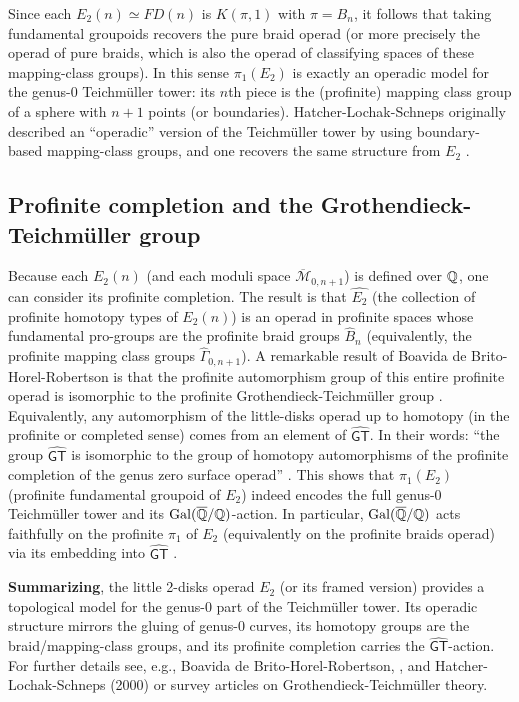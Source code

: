 Since each $E_2(n)\simeq FD(n)$ is $K(\pi,1)$ with $\pi=B_n$, it follows that taking fundamental groupoids recovers the pure braid operad (or more precisely the operad of pure braids, which is also the operad of classifying spaces of these mapping-class groups).  In this sense $\pi_1(E_2)$ is exactly an operadic model for the genus-0 Teichm\"uller tower: its $n$th piece is the (profinite) mapping class group of a sphere with $n+1$ points (or boundaries).  Hatcher-Lochak-Schneps originally described an “operadic” version of the Teichm\"uller tower by using boundary-based mapping-class groups, and one recovers the same structure from $E_2$ \cite{borghi_lecture_2025} \cite{de_brito_operads_2019}.

\subsection{Profinite completion and the Grothendieck-Teichm\"uller group}

Because each $E_2(n)$ (and each moduli space $\overline{\mathcal{M}}_{0,n+1}$) is defined over $\mathbb{Q}$, one can consider its profinite completion.  The result is that $\widehat{E_2}$ (the collection of profinite homotopy types of $E_2(n)$) is an operad in profinite spaces whose fundamental pro-groups are the profinite braid groups $\widehat B_n$ (equivalently, the profinite mapping class groups $\widehat\Gamma_{0,n+1}$).  A remarkable result of Boavida de Brito-Horel-Robertson is that the profinite automorphism group of this entire profinite operad is isomorphic to the profinite Grothendieck-Teichm\"uller group \cite{de_brito_operads_2019}. Equivalently, any automorphism of the little-disks operad up to homotopy (in the profinite or completed sense) comes from an element of $\widehat{\mathsf{GT}}$. In their words: “the group $\widehat{\mathsf{GT}}$ is isomorphic to the group of homotopy automorphisms of the profinite completion of the genus zero surface operad” \cite{de_brito_operads_2019}. This shows that $\pi_1(E_2)$ (profinite fundamental groupoid of $E_2$) indeed encodes the full genus-0 Teichm\"uller tower and its $\mathrm{Gal}(\overline{\mathbb{Q}}/\mathbb{Q})$-action.  In particular, $\mathrm{Gal}(\overline{\mathbb{Q}}/\mathbb{Q})$ acts faithfully on the profinite $\pi_1$ of $E_2$ (equivalently on the profinite braids operad) via its embedding into $\widehat{\mathsf{GT}}$ \cite{de_brito_operads_2019}.

\textbf{Summarizing}, the little 2-disks operad $E_2$ (or its framed version) provides a topological model for the genus-0 part of the Teichm\"uller tower.  Its operadic structure mirrors the gluing of genus-0 curves, its homotopy groups are the braid/mapping-class groups, and its profinite completion carries the $\widehat{\mathsf{GT}}$-action.  For further details see, e.g., Boavida de Brito-Horel-Robertson, \cite{de_brito_operads_2019}, and Hatcher-Lochak-Schneps (2000) or survey articles on Grothendieck-Teichm\"uller theory.

